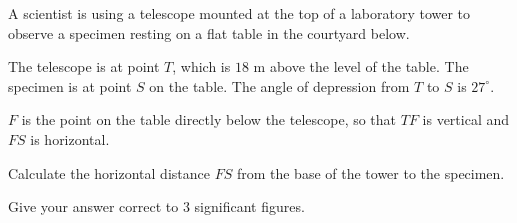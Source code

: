 \begin{question}
\noindent A scientist is using a telescope mounted at the top of a laboratory tower to observe a specimen resting on a flat table in the courtyard below.

The telescope is at point $T$, which is $18$ m above the level of the table. The specimen is at point $S$ on the table. The angle of depression from $T$ to $S$ is $27^{\circ}$.

\begin{center}
\end{center}

\noindent $F$ is the point on the table directly below the telescope, so that $TF$ is vertical and $FS$ is horizontal.

Calculate the horizontal distance $FS$ from the base of the tower to the specimen.

Give your answer correct to 3 significant figures.

\vspace{4cm}
\begin{flushright}
\end{flushright}
\end{question}
